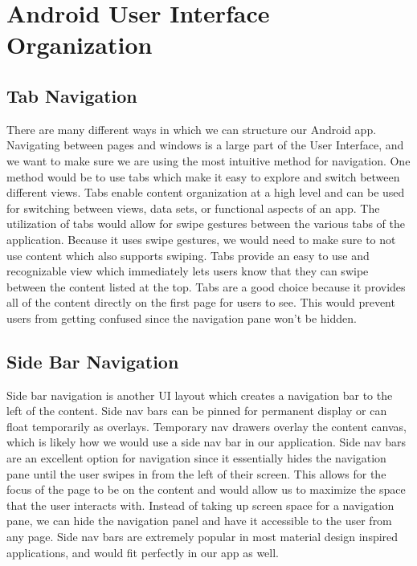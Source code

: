 \documentclass[letterpaper,10pt,draftclsnofoot,onecolumn,titlepage]{IEEEtran}
\begin{document}
	\section{Android User Interface Organization}
		\subsection{Tab Navigation}
			There are many different ways in which we can structure our Android app.
			Navigating between pages and windows is a large part of the User Interface, and we want to make sure we are using the most intuitive method for navigation.
			One method would be to use tabs which make it easy to explore and switch between different views.
			Tabs enable content organization at a high level and can be used for switching between views, data sets, or functional aspects of an app. \cite{Material-Tabs}
			The utilization of tabs would allow for swipe gestures between the various tabs of the application.
			Because it uses swipe gestures, we would need to make sure to not use content which also supports swiping.
			Tabs provide an easy to use and recognizable view which immediately lets users know that they can swipe between the content listed at the top.
			Tabs are a good choice because it provides all of the content directly on the first page for users to see.
			This would prevent users from getting confused since the navigation pane won't be hidden.

		\subsection{Side Bar Navigation}
			Side bar navigation is another UI layout which creates a navigation bar to the left of the content.
			Side nav bars can be pinned for permanent display or can float temporarily as overlays. \cite{Material-Side-Nav}
			Temporary nav drawers overlay the content canvas, which is likely how we would use a side nav bar in our application.
			Side nav bars are an excellent option for navigation since it essentially hides the navigation pane until the user swipes in from the left of their screen.
			This allows for the focus of the page to be on the content and would allow us to maximize the space that the user interacts with.
			Instead of taking up screen space for a navigation pane, we can hide the navigation panel and have it accessible to the user from any page.
			Side nav bars are extremely popular in most material design inspired applications, and would fit perfectly in our app as well.
\end{document}

